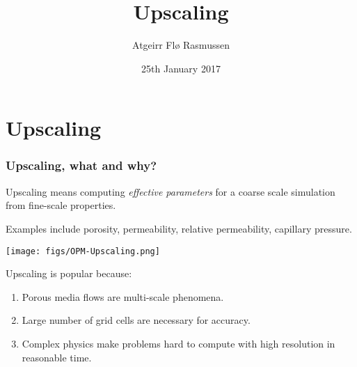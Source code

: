\documentclass[UKenglish,10pt]{beamer}
\title{Upscaling}
\author[Atgeirr F. Rasmussen]{Atgeirr Fl{\o} Rasmussen}
\institute[SINTEF]{SINTEF ICT, Dept. Applied Mathematics}
\date[2017--01--25]{25th January 2017}
\begin{document}
\section{Upscaling}



\begin{frame}
  \frametitle{Upscaling, what and why?}

  Upscaling means computing \emph{effective parameters} for a coarse
  scale simulation from fine-scale properties.
  \bigskip

  Examples include porosity, permeability, relative permeability,
  capillary pressure.
  \bigskip

  \texttt{[image: figs/OPM-Upscaling.png]}

  Upscaling is popular because:
  \begin{enumerate}
  \item Porous media flows are multi-scale phenomena.
  \item Large number of grid cells are necessary for accuracy.
  \item Complex physics make problems hard to compute with high
    resolution in reasonable time.
  \end{enumerate}
\end{frame}






\end{document}
